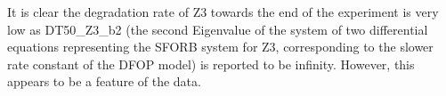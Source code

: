\documentclass[12pt,a4paper]{article}\usepackage[]{graphicx}\usepackage[]{color}
\begin{document}
It is clear the degradation rate of Z3 towards the end of the experiment 
is very low as DT50\_Z3\_b2 (the second Eigenvalue of the system of two differential 
equations representing the SFORB system for Z3, corresponding to the slower rate
constant of the DFOP model) is reported to be infinity.  However, this appears
to be a feature of the data.



\end{document}

